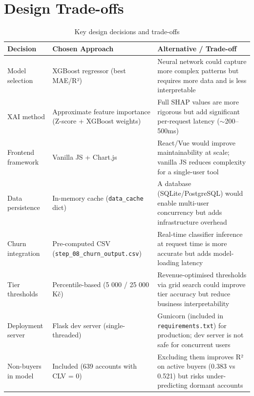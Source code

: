 \documentclass[11pt,a4paper]{article}
\begin{document}
\section{Design Trade-offs}

\begin{table}[H]
\centering\small
\begin{tabular}{p{3.5cm}p{5cm}p{4.5cm}}
\toprule
\textbf{Decision} & \textbf{Chosen Approach} & \textbf{Alternative / Trade-off} \\
\midrule
Model selection
  & XGBoost regressor (best MAE/R²)
  & Neural network could capture more complex patterns but requires more data and is less interpretable \\
\midrule
XAI method
  & Approximate feature importance (Z-score + XGBoost weights)
  & Full SHAP values are more rigorous but add significant per-request latency ($\sim$200–500ms) \\
\midrule
Frontend framework
  & Vanilla JS + Chart.js
  & React/Vue would improve maintainability at scale; vanilla JS reduces complexity for a single-user tool \\
\midrule
Data persistence
  & In-memory cache (\texttt{data\_cache} dict)
  & A database (SQLite/PostgreSQL) would enable multi-user concurrency but adds infrastructure overhead \\
\midrule
Churn integration
  & Pre-computed CSV (\texttt{step\_08\_churn\_output.csv})
  & Real-time classifier inference at request time is more accurate but adds model-loading latency \\
\midrule
Tier thresholds
  & Percentile-based (5 000 / 25 000 Kč)
  & Revenue-optimised thresholds via grid search could improve tier accuracy but reduce business interpretability \\
\midrule
Deployment server
  & Flask dev server (single-threaded)
  & Gunicorn (included in \texttt{requirements.txt}) for production; dev server is not safe for concurrent users \\
\midrule
Non-buyers in model
  & Included (639 accounts with CLV = 0)
  & Excluding them improves R² on active buyers (0.383 vs 0.521) but risks under-predicting dormant accounts \\
\bottomrule
\end{tabular}
\caption{Key design decisions and trade-offs}
\end{table}
\end{document}
